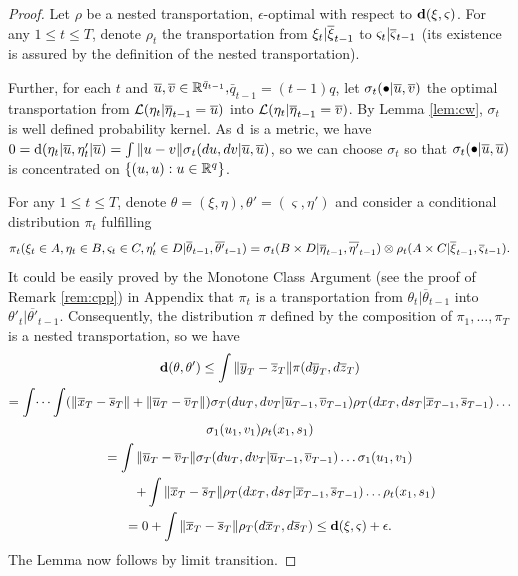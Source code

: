 \documentclass{article}              %
\begin{document}
\begin{proof}
Let $\rho$ be a nested transportation, $\epsilon$-optimal with respect
to $\mathbf{d}(\xi,\varsigma)$. For any $1\leq t\leq T$, denote $\rho_t$ the transportation from $\xi_t|\overline{\xi}_{t-1}$ to 
$\varsigma_t|\overline{\varsigma}_{t-1}$ (its existence is assured by the definition of the nested transportation).

Further, for each $t$ and $\overline{u},\overline{v}\in\mathbb{R}^{\bar{q}_{t-1}},$$\bar{q}_{t-1}=(t-1)q$,
let $\sigma_{t}(\bullet|\overline{u},\overline{v})$ the optimal transportation
from $\mathcal{L}(\eta_{t}|\overline{\eta}_{t-1}=\overline{u})$ into $\mathcal{L}(\eta_{t}|\overline{\eta}_{t-1}=\overline{v})$.
By Lemma \ref{lem:cw}, $\sigma_{t}$ is well defined probability
kernel. As $\mathrm{d}$ is a metric, we have $0=\mathrm{d}(\eta_{t}|\overline{u},\eta'_{t}|\overline{u})=\int\|u-v\|\sigma{}_{t}(du,dv|\overline{u},\overline{u})$, so we can choose $\sigma_{t}$ so that $\sigma_{t}(\bullet|\overline{u},\overline{u})$
is concentrated on $\{(u,u):u\in\mathbb{R}^{q}\}$.

For any $1\leq t\leq T$, denote $\theta=(\xi,\eta),$$\theta'=(\varsigma,\eta')$
and consider a conditional distribution $\pi_t$ fulfilling
\[
\pi_{t}(\xi_{t}\in A,\eta_{t}\in B,\varsigma_{t}\in C,\eta'_{t}\in D|\overline{\theta}_{t-1},\overline{\theta'}_{t-1})=\sigma_{t}(B\times D|\overline{\eta}_{t-1},\overline{\eta'}_{t-1})\otimes\rho_{t}(A\times C|\overline{\xi}_{t-1},\overline{\varsigma}_{t-1}).
\]
It could be easily proved by the Monotone Class Argument (see the
proof of Remark \ref{rem:cpp}) in Appendix that $\pi_{t}$ is a transportation
from $\theta_{t}|\overline{\theta}_{t-1}$ into $\theta'_{t}|\overline{\theta'}_{t-1}$.
Consequently, the distribution $\pi$ defined by the composition of
$\pi_{1},\dots,\pi_{T}$ is a nested transportation, so we have
\begin{multline*}
\mathbf{d}(\theta,\theta')\leq\int\|\overline{y}_{T}-\overline{z}_{T}\|\pi(d\overline{y}_{T},d\overline{z}_{T})\\
=\int\dots\int(\|\overline{x}_{T}-\overline{s}_{T}\|+\|\overline{u}_{T}-\overline{v}_{T}\|)\sigma_{T}(du_{T},dv_{T}|\overline{u}_{T-1},\overline{v}_{T-1})\rho_{T}(dx_{T},ds_{T}|\overline{x}_{T-1},\overline{s}_{T-1})\dots\\
\sigma_{1}(u_{1},v_{1})\rho_{t}(x_{1},s_{1})\\
=\int\|\overline{u}_{T}-\overline{v}_{T}\|\sigma_{T}(du_{T},dv_{T}|\overline{u}_{T-1},\overline{v}_{T-1})\dots\sigma_{1}(u_{1},v_{1})
\\
\qquad\qquad +\int\|\overline{x}_{T}-\overline{s}_{T}\|\rho_{T}(dx_{T},ds_{T}|\overline{x}_{T-1},\overline{s}_{T-1})\dots\rho_{t}(x_{1},s_{1})\\
=0+\int\|\overline{x}_{T}-\overline{s}_{T}\|\rho_{T}(d\overline{x}_{T},d\overline{s}_{T})\leq\mathbf{d}(\xi,\varsigma)+\epsilon.
\end{multline*}
The Lemma now follows by limit transition.
\end{proof}
 
\end{document}
